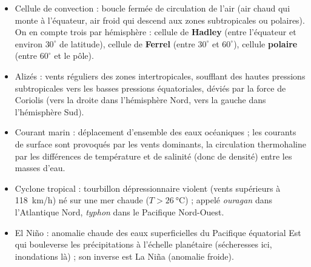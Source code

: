 \documentclass[11pt]{article}
\newcommand{\cle}[1]{{\popxbold\color{popdark}#1}}
\begin{document}
\begin{aretenir}
\begin{itemize}
  \item \cle{Cellule de convection} : boucle fermée de circulation de l'air (air chaud qui monte à l'équateur, air froid qui descend aux zones subtropicales ou polaires). On en compte trois par hémisphère : cellule de \textbf{Hadley} (entre l'équateur et environ $30^{\circ}$ de latitude), cellule de \textbf{Ferrel} (entre $30^{\circ}$ et $60^{\circ}$), cellule \textbf{polaire} (entre $60^{\circ}$ et le pôle).
  \item \cle{Alizés} : vents réguliers des zones intertropicales, soufflant des hautes pressions subtropicales vers les basses pressions équatoriales, déviés par la force de Coriolis (vers la droite dans l'hémisphère Nord, vers la gauche dans l'hémisphère Sud).
  \item \cle{Courant marin} : déplacement d'ensemble des eaux océaniques ; les courants de surface sont provoqués par les vents dominants, la circulation \cle{thermohaline} par les différences de température et de salinité (donc de densité) entre les masses d'eau.
  \item \cle{Cyclone tropical} : tourbillon dépressionnaire violent (vents supérieurs à \SI{118}{km/h}) né sur une mer chaude ($T > \SI{26}{\celsius}$) ; appelé \emph{ouragan} dans l'Atlantique Nord, \emph{typhon} dans le Pacifique Nord-Ouest.
  \item \cle{El Ni\~no} : anomalie chaude des eaux superficielles du Pacifique équatorial Est qui bouleverse les précipitations à l'échelle planétaire (sécheresses ici, inondations là) ; son inverse est \cle{La Ni\~na} (anomalie froide).
\end{itemize}
\end{aretenir}
\end{document}
